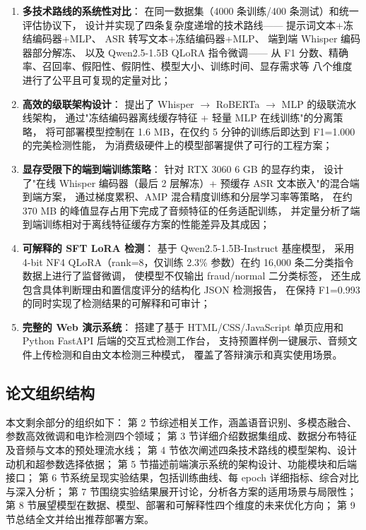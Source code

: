 \documentclass[11pt,a4paper]{ctexart}
\begin{document}
\begin{enumerate}[label=(\arabic*)]
  \item \textbf{多技术路线的系统性对比}：
  在同一数据集（4000 条训练/400 条测试）和统一评估协议下，
  设计并实现了四条复杂度递增的技术路线——
  提示词文本+冻结编码器+MLP、
  ASR 转写文本+冻结编码器+MLP、
  端到端 Whisper 编码器部分解冻、
  以及 Qwen2.5-1.5B QLoRA 指令微调——
  从 F1 分数、精确率、召回率、假阳性、假阴性、模型大小、训练时间、显存需求等
  八个维度进行了公平且可复现的定量对比；

  \item \textbf{高效的级联架构设计}：
  提出了 Whisper $\rightarrow$ RoBERTa $\rightarrow$ MLP 的级联流水线架构，
  通过"冻结编码器离线缓存特征 + 轻量 MLP 在线训练"的分离策略，
  将可部署模型控制在 1.6 MB，在仅约 5 分钟的训练后即达到 F1=1.000 的完美检测性能，
  为消费级硬件上的模型部署提供了可行的工程方案；

  \item \textbf{显存受限下的端到端训练策略}：
  针对 RTX 3060 6 GB 的显存约束，
  设计了"在线 Whisper 编码器（最后 2 层解冻）+ 预缓存 ASR 文本嵌入"的混合端到端方案，
  通过梯度累积、AMP 混合精度训练和分层学习率等策略，
  在约 370 MB 的峰值显存占用下完成了音频特征的任务适配训练，
  并定量分析了端到端训练相对于离线特征缓存方案的性能差异及其成因；

  \item \textbf{可解释的 SFT LoRA 检测}：
  基于 Qwen2.5-1.5B-Instruct 基座模型，
  采用 4-bit NF4 QLoRA（rank=8，仅训练 2.3\% 参数）在约 16,000 条二分类指令数据上进行了监督微调，
  使模型不仅输出 fraud/normal 二分类标签，
  还生成包含具体判断理由和置信度评分的结构化 JSON 检测报告，
  在保持 F1=0.993 的同时实现了检测结果的可解释和可审计；

  \item \textbf{完整的 Web 演示系统}：
  搭建了基于 HTML/CSS/JavaScript 单页应用和 Python FastAPI 后端的交互式检测工作台，
  支持预置样例一键展示、音频文件上传检测和自由文本检测三种模式，
  覆盖了答辩演示和真实使用场景。
\end{enumerate}

\subsection{论文组织结构}

本文剩余部分的组织如下：
第 2 节综述相关工作，涵盖语音识别、多模态融合、参数高效微调和电诈检测四个领域；
第 3 节详细介绍数据集组成、数据分布特征及音频与文本的预处理流水线；
第 4 节依次阐述四条技术路线的模型架构、设计动机和超参数选择依据；
第 5 节描述前端演示系统的架构设计、功能模块和后端接口；
第 6 节系统呈现实验结果，包括训练曲线、每 epoch 详细指标、综合对比与深入分析；
第 7 节围绕实验结果展开讨论，分析各方案的适用场景与局限性；
第 8 节展望模型在数据、模型、部署和可解释性四个维度的未来优化方向；
第 9 节总结全文并给出推荐部署方案。
\end{document}
